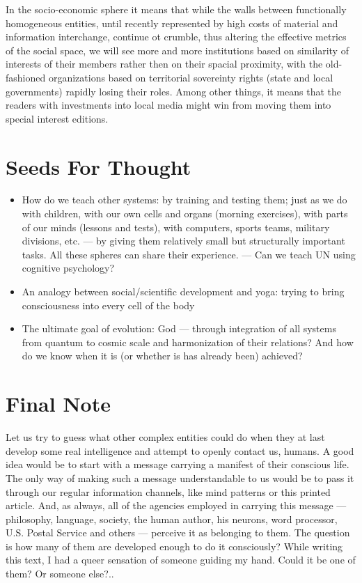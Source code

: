      In the socio-economic  sphere  it  means  that  while  the  walls
between  functionally homogeneous entities, until recently represented
by high costs of material and  information  interchange,  continue  ot
crumble,  thus  altering the effective metrics of the social space, we
will see more and more institutions based on similarity  of  interests
of  their  members  rather  then  on their spacial proximity, with the
old-fashioned organizations based  on  territorial  sovereinty  rights
(state and local governments) rapidly losing their roles.  Among other
things, it means that the readers with investments  into  local  media
might win from moving them into special interest editions.



\section{Seeds For Thought}

\begin{itemize}
    \item How do we teach other systems:  by training and  testing  them;
just  as  we  do with children, with our own cells and organs (morning
exercises),  with  parts  of  our  minds  (lessons  and  tests),  with
computers,  sports  teams,  military divisions, etc.  --- by giving them
relatively small but structurally important tasks.  All these  spheres
can  share  their  experience.   ---  Can  we  teach  UN using cognitive
psychology?

    \item An analogy  between  social/scientific  development  and  yoga:
trying to bring consciousness into every cell of the body

    \item The ultimate goal of evolution:  God --- through  integration  of
all  systems  from  quantum to cosmic scale and harmonization of their
relations?  And how do we know when it is (or whether is  has  already
been) achieved?
\end{itemize}


\section{Final Note}

     Let us try to guess what other complex  entities  could  do  when
they  at  last  develop  some  real intelligence and attempt to openly
contact us, humans.  A good idea would be  to  start  with  a  message
carrying  a  manifest of their conscious life.  The only way of making
such a message understandable to us would be to pass  it  through  our
regular  information  channels,  like  mind  patterns  or this printed
article.  And, as always, all of the  agencies  employed  in  carrying
this  message  ---  philosophy, language, society, the human author, his
neurons, word processor, U.S.  Postal Service and others --- perceive it
as  belonging to them.  The question is how many of them are developed
enough to do it consciously?  While writing this text, I had  a  queer
sensation  of  someone  guiding my hand.  Could it be one of them?  Or
someone else?..


